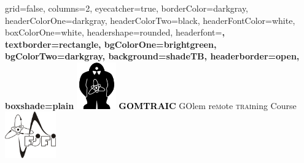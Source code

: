 \documentclass[a4paper,portrait,fontscale=0.65]{baposter}
\begin{document}


\begin{poster}{
	grid=false,
        columns=2,
	eyecatcher=true, 
	borderColor=darkgray,
	headerColorOne=darkgray,
	headerColorTwo=black,
	headerFontColor=white,
	boxColorOne=white,
	headershape=rounded,
	headerfont=\Large\sf\bf,
	textborder=rectangle,
        bgColorOne=brightgreen,
        bgColorTwo=darkgray,
	background=shadeTB,
	headerborder=open,
  boxshade=plain
}
{
  \includegraphics[height=2cm]{golem}
}
{
\textcolor{black}{\Huge\textbf{\textsc{GOMTRAIC}}}\vspace{0.5em}
}
{
 \textsc{GO}lem re\textsc{m}ote \textsc{trai}ning \textsc{C}ourse
}
{
\includegraphics[height=2cm]{fjfi.png}
}


\end{poster}
\end{document}
